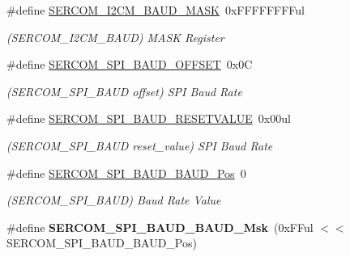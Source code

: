 \begin{DoxyCompactItemize}
\item 
\hypertarget{group___s_a_m_l21___s_e_r_c_o_m_ga8c81b886577e6440a2083c650de1eb00}{}\#define \hyperlink{group___s_a_m_l21___s_e_r_c_o_m_ga8c81b886577e6440a2083c650de1eb00}{S\+E\+R\+C\+O\+M\+\_\+\+I2\+C\+M\+\_\+\+B\+A\+U\+D\+\_\+\+M\+A\+S\+K}~0x\+F\+F\+F\+F\+F\+F\+F\+Ful\label{group___s_a_m_l21___s_e_r_c_o_m_ga8c81b886577e6440a2083c650de1eb00}

\begin{DoxyCompactList}\small\item\em (S\+E\+R\+C\+O\+M\+\_\+\+I2\+C\+M\+\_\+\+B\+A\+U\+D) M\+A\+S\+K Register \end{DoxyCompactList}\item 
\hypertarget{group___s_a_m_l21___s_e_r_c_o_m_ga0382165ae6ef628be8b954f9ed91f146}{}\#define \hyperlink{group___s_a_m_l21___s_e_r_c_o_m_ga0382165ae6ef628be8b954f9ed91f146}{S\+E\+R\+C\+O\+M\+\_\+\+S\+P\+I\+\_\+\+B\+A\+U\+D\+\_\+\+O\+F\+F\+S\+E\+T}~0x0\+C\label{group___s_a_m_l21___s_e_r_c_o_m_ga0382165ae6ef628be8b954f9ed91f146}

\begin{DoxyCompactList}\small\item\em (S\+E\+R\+C\+O\+M\+\_\+\+S\+P\+I\+\_\+\+B\+A\+U\+D offset) S\+P\+I Baud Rate \end{DoxyCompactList}\item 
\hypertarget{group___s_a_m_l21___s_e_r_c_o_m_ga35a85b6b22cc1b3f8ed916db5506384a}{}\#define \hyperlink{group___s_a_m_l21___s_e_r_c_o_m_ga35a85b6b22cc1b3f8ed916db5506384a}{S\+E\+R\+C\+O\+M\+\_\+\+S\+P\+I\+\_\+\+B\+A\+U\+D\+\_\+\+R\+E\+S\+E\+T\+V\+A\+L\+U\+E}~0x00ul\label{group___s_a_m_l21___s_e_r_c_o_m_ga35a85b6b22cc1b3f8ed916db5506384a}

\begin{DoxyCompactList}\small\item\em (S\+E\+R\+C\+O\+M\+\_\+\+S\+P\+I\+\_\+\+B\+A\+U\+D reset\+\_\+value) S\+P\+I Baud Rate \end{DoxyCompactList}\item 
\hypertarget{group___s_a_m_l21___s_e_r_c_o_m_gab3954fea9c2f190a4322171bde60f5ce}{}\#define \hyperlink{group___s_a_m_l21___s_e_r_c_o_m_gab3954fea9c2f190a4322171bde60f5ce}{S\+E\+R\+C\+O\+M\+\_\+\+S\+P\+I\+\_\+\+B\+A\+U\+D\+\_\+\+B\+A\+U\+D\+\_\+\+Pos}~0\label{group___s_a_m_l21___s_e_r_c_o_m_gab3954fea9c2f190a4322171bde60f5ce}

\begin{DoxyCompactList}\small\item\em (S\+E\+R\+C\+O\+M\+\_\+\+S\+P\+I\+\_\+\+B\+A\+U\+D) Baud Rate Value \end{DoxyCompactList}\item 
\hypertarget{group___s_a_m_l21___s_e_r_c_o_m_gafc2bbaa2b94a59465654434bff291f4a}{}\#define {\bfseries S\+E\+R\+C\+O\+M\+\_\+\+S\+P\+I\+\_\+\+B\+A\+U\+D\+\_\+\+B\+A\+U\+D\+\_\+\+Msk}~(0x\+F\+Ful $<$$<$ S\+E\+R\+C\+O\+M\+\_\+\+S\+P\+I\+\_\+\+B\+A\+U\+D\+\_\+\+B\+A\+U\+D\+\_\+\+Pos)\label{group___s_a_m_l21___s_e_r_c_o_m_gafc2bbaa2b94a59465654434bff291f4a}


\end{DoxyCompactItemize}
